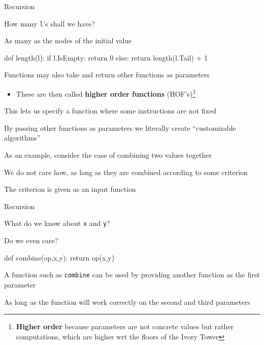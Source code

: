 \documentclass{beamer}
\begin{document}
\begin{frame}[fragile]{Recursion}
\begin{codewithblock}{\item How many \texttt{l}'s shall we have? \pause \item As many as the nodes of the initial value}
def length(l):
  if l.IsEmpty:
    return 0
  else:
    return length(l.Tail) + 1
\end{codewithblock}
\end{frame}

\begin{slide}{
\item Functions may also take and return other functions as parameters
\begin{itemize}
\item These are then called \textbf{higher order functions} (HOF's)\footnote{\pause \textbf{Higher order} because parameters are not concrete values but rather computations, which are higher wrt the floors of the Ivory Tower}
\end{itemize}
\item This lets us specify a function where some instructions are not fixed
\item By passing other functions as parameters we literally create ``customizable algorithms''
}\end{slide}

\begin{slide}{
\item As an example, consider the case of combining two values together
\item We do not care how, as long as they are combined according to some criterion
\item The criterion is given as an input function
}\end{slide}

\begin{frame}[fragile]{Recursion}
\begin{codewithblock}{\item What do we know about \texttt{x} and \texttt{y}? \item Do we even care?}
def combine(op,x,y):
  return op(x,y)
\end{codewithblock}
\end{frame}

\begin{slide}{
\item A function such as \texttt{combine} can be used by providing another function as the first parameter
\item As long as the function will work correctly on the second and third parameters
}\end{slide}
\end{document}
